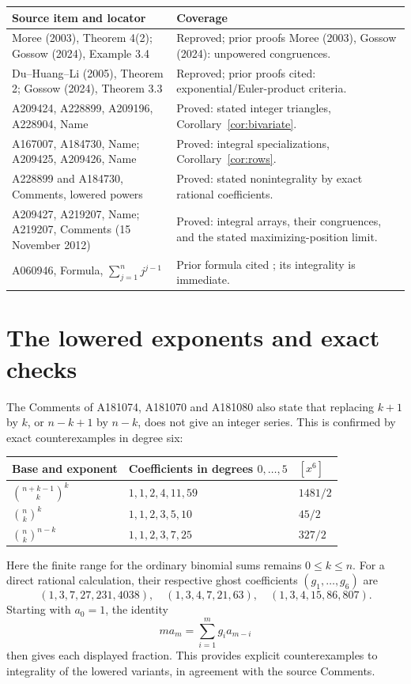 \documentclass[11pt]{article}
\begin{document}
\begin{center}\small
\begin{tabular}{@{}>{\raggedright\arraybackslash}p{.40\linewidth}>{\raggedright\arraybackslash}p{.54\linewidth}@{}}
\toprule
Source item and locator & Coverage\\
\midrule
Moree (2003), Theorem 4(2); Gossow (2024), Example 3.4
 & Reproved; prior proofs Moree (2003), Gossow (2024): unpowered congruences.\\
Du--Huang--Li (2005), Theorem 2; Gossow (2024), Theorem 3.3
 & Reproved; prior proofs cited: exponential/Euler-product criteria.\\
A209424, A228899, A209196, A228904, Name
 & Proved: stated integer triangles, Corollary~\ref{cor:bivariate}.\\
A167007, A184730, Name; A209425, A209426, Name
 & Proved: integral specializations, Corollary~\ref{cor:rows}.\\
A228899 and A184730, Comments, lowered powers
 & Proved: stated nonintegrality by exact rational coefficients.\\
A209427, A219207, Name; A219207, Comments (15 November 2012)
 & Proved: integral arrays, their congruences, and the stated maximizing-position limit.\\
A060946, Formula, $\sum_{j=1}^n j^{j-1}$
 & Prior formula cited \cite{trace}; its integrality is immediate.\\
\bottomrule
\end{tabular}
\end{center}

\section{The lowered exponents and exact checks}

The Comments of A181074, A181070 and A181080 also state that replacing
\(k+1\) by \(k\), or \(n-k+1\) by \(n-k\), does not give an integer
series. This is confirmed by exact counterexamples in degree six:
\begin{center}\small
\begin{tabular}{@{}lll@{}}
\toprule
Base and exponent & Coefficients in degrees $0,\ldots,5$ & $[x^6]$\\
\midrule
$\binom{n+k-1}{k}^{k}$ & $1,1,2,4,11,59$ & $1481/2$\\
$\binom nk^{k}$ & $1,1,2,3,5,10$ & $45/2$\\
$\binom nk^{n-k}$ & $1,1,2,3,7,25$ & $327/2$\\
\bottomrule
\end{tabular}
\end{center}
Here the finite range for the ordinary binomial sums remains \(0\le k\le n\).
For a direct rational calculation, their respective ghost coefficients
\((g_1,\ldots,g_6)\) are
\[
 (1,3,7,27,231,4038),\quad
 (1,3,4,7,21,63),\quad
 (1,3,4,15,86,807).
\]
Starting with \(a_0=1\), the identity
\begin{equation}\label{eq:recurrence}
 ma_m=\sum_{i=1}^m g_i a_{m-i}
\end{equation}
then gives each displayed fraction. This provides explicit counterexamples
to integrality of the lowered variants, in agreement with the source Comments.
\end{document}
